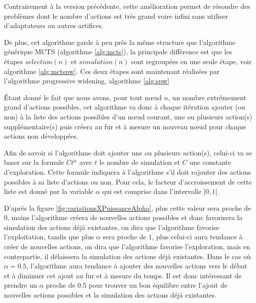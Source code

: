 \documentclass[pdftex,french, english]{article}	%
\begin{document}
		Contrairement à la version précédente, cette amélioration permet de résoudre des problèmes dont le nombre d'actions est très grand voire infini sans utiliser d'adaptateurs ou autres artifices.

		De plus, cet algorithme garde à peu près la même structure que l'algorithme générique MCTS (algorithme \ref{alg:mcts}), la principale différence est que les étapes $selection(n)$ et $simulation(n)$ sont regroupées en une seule étape, voir algorithme \ref{alg:mctspw}.
        Ces deux étapes sont maintenant réalisées par l'algorithme progressive widening, algorithme \ref{alg:spw} 

		Étant donné le fait que nous avons, pour tout nœud $n$, un nombre extrêmement grand d'actions possibles, cet algorithme va donc à chaque itération ajouter (ou non) à la liste des actions possibles d'un nœud courant, une ou plusieurs action(s) supplémentaire(s) puis créera au fur et à mesure un nouveau nœud pour chaque actions non développées.

		Afin de savoir si l'algorithme doit ajouter une ou plusieurs action(s), celui-ci va se baser sur la formule $Ct^\alpha$ avec $t$ le nombre de simulation et $C$ une constante d'exploration. Cette formule indiquera à l'algorithme s'il doit rajouter des actions possibles à sa liste d'actions ou non. Pour cela, le facteur d’accroissement de cette liste est donné par la variable $\alpha$ qui est comprise dans l'intervalle $]0, 1[$. 
        
        D'après la figure \ref{fig:variationsXPuissanceAlpha}, plus cette valeur sera proche de 0, moins l'algorithme créera de nouvelles actions possibles et donc favorisera la simulation des actions déjà existantes, on dira que l'algorithme favorise l'exploitation, tandis que plus $\alpha$ sera proche de $1$, plus celui-ci aura tendance à créer de nouvelles actions, on dira que l'algorithme favorise l'exploration, mais en contrepartie, il délaissera la simulation des actions déjà existantes. Dans le cas où $\alpha = 0.5$, l'algorithme aura tendance à ajouter des nouvelles actions vers le début et à diminuer cet ajout au fur et à mesure du temps. Il est donc intéressant de prendre un $\alpha$ proche de $0.5$ pour trouver un bon équilibre entre l'ajout de nouvelles actions possibles et la simulation des actions déjà existantes.
\end{document}
